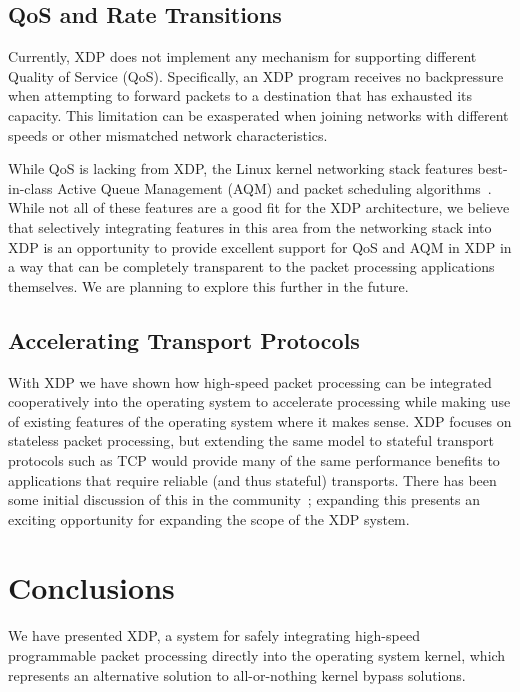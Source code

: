 \documentclass[10pt,sigconf,anonymous]{acmart}
\begin{document}
\subsection{QoS and Rate Transitions}
\label{sec:handl-rate-trans}
Currently, XDP does not implement any mechanism for supporting different Quality
of Service (QoS). Specifically, an XDP program receives no backpressure when
attempting to forward packets to a destination that has exhausted its capacity.
This limitation can be exasperated when joining networks with different speeds
or other mismatched network characteristics.

While QoS is lacking from XDP, the Linux kernel networking stack features
best-in-class Active Queue Management (AQM) and packet scheduling
algorithms~\cite{good-bad-wifi}. While not all of these features are a good fit
for the XDP architecture, we believe that selectively integrating features in
this area from the networking stack into XDP is an opportunity to provide
excellent support for QoS and AQM in XDP in a way that can be completely
transparent to the packet processing applications themselves. We are planning to
explore this further in the future.

\subsection{Accelerating Transport Protocols}
\label{sec:accel-transp-prot}

With XDP we have shown how high-speed packet processing can be integrated
cooperatively into the operating system to accelerate processing while making
use of existing features of the operating system where it makes sense. XDP
focuses on stateless packet processing, but extending the same model to stateful
transport protocols such as TCP would provide many of the same performance
benefits to applications that require reliable (and thus stateful) transports.
There has been some initial discussion of this in the community~\cite{txdp};
expanding this presents an exciting opportunity for expanding the scope of the
XDP system.

\section{Conclusions}
\label{sec:conclusion}
We have presented XDP, a system for safely integrating high-speed programmable
packet processing directly into the operating system kernel, which represents an
alternative solution to all-or-nothing kernel bypass solutions.
\end{document}
